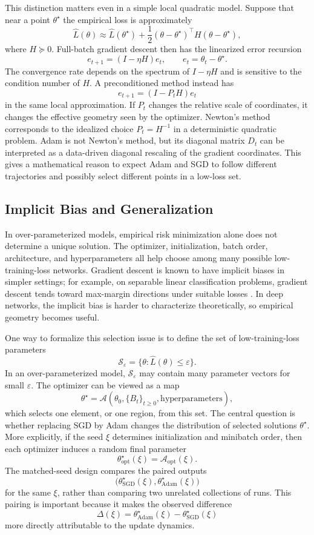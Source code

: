 \documentclass[11pt]{article}
\begin{document}
This distinction matters even in a simple local quadratic model. Suppose that near a point $\theta^\star$ the empirical loss is approximately
\[
\widehat L(\theta)
\approx
\widehat L(\theta^\star)
+
\frac{1}{2}(\theta-\theta^\star)^\top H(\theta-\theta^\star),
\]
where $H\succeq 0$. Full-batch gradient descent then has the linearized error recursion
\[
e_{t+1}
=
(I-\eta H)e_t,
\qquad
e_t=\theta_t-\theta^\star.
\]
The convergence rate depends on the spectrum of $I-\eta H$ and is sensitive to the condition number of $H$. A preconditioned method instead has
\[
e_{t+1}
=
(I-P_tH)e_t
\]
in the same local approximation. If $P_t$ changes the relative scale of coordinates, it changes the effective geometry seen by the optimizer. Newton's method corresponds to the idealized choice $P_t=H^{-1}$ in a deterministic quadratic problem. Adam is not Newton's method, but its diagonal matrix $D_t$ can be interpreted as a data-driven diagonal rescaling of the gradient coordinates. This gives a mathematical reason to expect Adam and SGD to follow different trajectories and possibly select different points in a low-loss set.

\subsection{Implicit Bias and Generalization}

In over-parameterized models, empirical risk minimization alone does not determine a unique solution. The optimizer, initialization, batch order, architecture, and hyperparameters all help choose among many possible low-training-loss networks. Gradient descent is known to have implicit biases in simpler settings; for example, on separable linear classification problems, gradient descent tends toward max-margin directions under suitable losses \cite{soudry2018implicit}. In deep networks, the implicit bias is harder to characterize theoretically, so empirical geometry becomes useful.

One way to formalize this selection issue is to define the set of low-training-loss parameters
\[
\mathcal{S}_\varepsilon
= \{\theta : \widehat L(\theta) \le \varepsilon\}.
\]
In an over-parameterized model, $\mathcal{S}_\varepsilon$ may contain many parameter vectors for small $\varepsilon$. The optimizer can be viewed as a map
\[
\theta^\star
= \mathcal{A}(\theta_0,\{B_t\}_{t\ge 0},\mathrm{hyperparameters}),
\]
which selects one element, or one region, from this set. The central question is whether replacing SGD by Adam changes the distribution of selected solutions $\theta^\star$. More explicitly, if the seed $\xi$ determines initialization and minibatch order, then each optimizer induces a random final parameter
\[
\theta^\star_{\mathrm{opt}}(\xi)
=
\mathcal{A}_{\mathrm{opt}}(\xi).
\]
The matched-seed design compares the paired outputs
\[
\big(\theta^\star_{\mathrm{SGD}}(\xi),\theta^\star_{\mathrm{Adam}}(\xi)\big)
\]
for the same $\xi$, rather than comparing two unrelated collections of runs. This pairing is important because it makes the observed difference
\[
\Delta(\xi)
=
\theta^\star_{\mathrm{Adam}}(\xi)-\theta^\star_{\mathrm{SGD}}(\xi)
\]
more directly attributable to the update dynamics.
\end{document}
